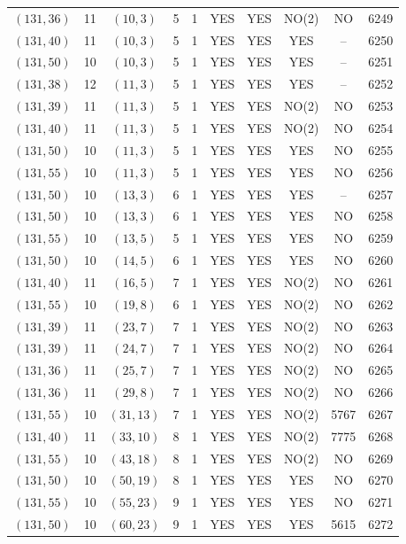 \begin{longtable}{|c|c|c|c|c|c|c|c|c|c|}
$(131, 36)$ & 11 & $(10, 3)$ & 5 & 1 & YES & YES & NO(2) & NO & 6249\\
$(131, 40)$ & 11 & $(10, 3)$ & 5 & 1 & YES & YES & YES & -- & 6250\\
$(131, 50)$ & 10 & $(10, 3)$ & 5 & 1 & YES & YES & YES & -- & 6251\\
$(131, 38)$ & 12 & $(11, 3)$ & 5 & 1 & YES & YES & YES & -- & 6252\\
$(131, 39)$ & 11 & $(11, 3)$ & 5 & 1 & YES & YES & NO(2) & NO & 6253\\
$(131, 40)$ & 11 & $(11, 3)$ & 5 & 1 & YES & YES & NO(2) & NO & 6254\\
$(131, 50)$ & 10 & $(11, 3)$ & 5 & 1 & YES & YES & YES & NO & 6255\\
$(131, 55)$ & 10 & $(11, 3)$ & 5 & 1 & YES & YES & YES & NO & 6256\\
$(131, 50)$ & 10 & $(13, 3)$ & 6 & 1 & YES & YES & YES & -- & 6257\\
$(131, 50)$ & 10 & $(13, 3)$ & 6 & 1 & YES & YES & YES & NO & 6258\\
$(131, 55)$ & 10 & $(13, 5)$ & 5 & 1 & YES & YES & YES & NO & 6259\\
$(131, 50)$ & 10 & $(14, 5)$ & 6 & 1 & YES & YES & YES & NO & 6260\\
$(131, 40)$ & 11 & $(16, 5)$ & 7 & 1 & YES & YES & NO(2) & NO & 6261\\
$(131, 55)$ & 10 & $(19, 8)$ & 6 & 1 & YES & YES & NO(2) & NO & 6262\\
$(131, 39)$ & 11 & $(23, 7)$ & 7 & 1 & YES & YES & NO(2) & NO & 6263\\
$(131, 39)$ & 11 & $(24, 7)$ & 7 & 1 & YES & YES & NO(2) & NO & 6264\\
$(131, 36)$ & 11 & $(25, 7)$ & 7 & 1 & YES & YES & NO(2) & NO & 6265\\
$(131, 36)$ & 11 & $(29, 8)$ & 7 & 1 & YES & YES & NO(2) & NO & 6266\\
$(131, 55)$ & 10 & $(31, 13)$ & 7 & 1 & YES & YES & NO(2) & 5767 & 6267\\
$(131, 40)$ & 11 & $(33, 10)$ & 8 & 1 & YES & YES & NO(2) & 7775 & 6268\\
$(131, 55)$ & 10 & $(43, 18)$ & 8 & 1 & YES & YES & NO(2) & NO & 6269\\
$(131, 50)$ & 10 & $(50, 19)$ & 8 & 1 & YES & YES & YES & NO & 6270\\
$(131, 55)$ & 10 & $(55, 23)$ & 9 & 1 & YES & YES & YES & NO & 6271\\
$(131, 50)$ & 10 & $(60, 23)$ & 9 & 1 & YES & YES & YES & 5615 & 6272\\

\end{longtable}
